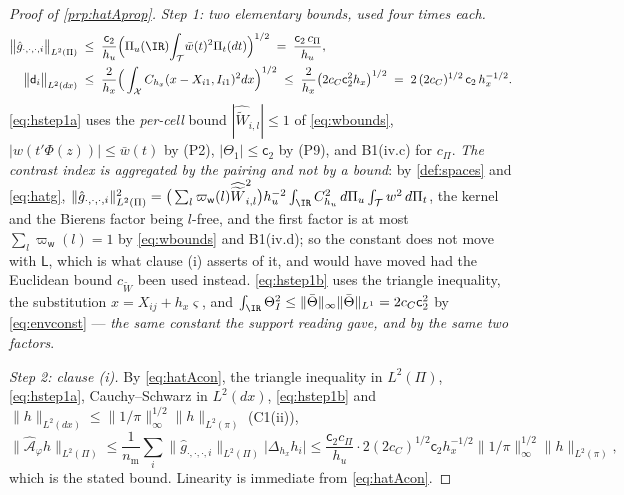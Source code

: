 \begin{proof}[Proof of \cref{prp:hatAprop}]
\emph{Step 1: two elementary bounds, used four times each.}
\begin{align}
\big\|\hat g_{\cdot,\cdot,\cdot,i}\big\|_{L^{2}(\Pi)}
&\;\le\;\frac{\mathsf c_2}{h_u}\Big(\Pi_u(\IR)\!\int_{\mathcal T}\!\bar w(t)^{2}\Pi_t(dt)\Big)^{1/2}
\;=\;\frac{\mathsf c_2\,c_\Pi}{h_u},
\label{eq:hstep1a}\\
\big\|\mathsf d_i\big\|_{L^{2}(dx)}
&\;\le\;\frac{2}{h_x}\Big(\int_{\mathcal X}C_{h_x}(x-X_{i1},I_{i1})^{2}dx\Big)^{1/2}
\;\le\;\frac{2}{h_x}\big(2c_C\mathsf c_2^{2}h_x\big)^{1/2}
\;=\;2\,(2c_C)^{1/2}\,\mathsf c_2\,h_x^{-1/2}.
\label{eq:hstep1b}
\end{align}
\eqref{eq:hstep1a} uses the \emph{per-cell} bound $|\widehat{\widetilde W}_{i,l}|\le1$ of
\eqref{eq:wbounds}, $|w(t'\Phi(z))|\le\bar w(t)$ by (P2), $|\Theta_1|\le\mathsf c_2$ by (P9),
and B1(iv.c) for $c_\Pi$. \emph{The contrast index is aggregated by the pairing and not by a bound}:
by \cref{def:spaces} and \eqref{eq:hatg},
$\|\hat g_{\cdot,\cdot,\cdot,i}\|^{2}_{L^{2}(\Pi)}
=\big(\sum_l\varpi_{\mathsf w}(l)\widehat{\widetilde W}_{i,l}^{2}\big)h_u^{-2}
\int_\IR C_{h_u}^{2}\,d\Pi_u\int_{\mathcal T}w^{2}\,d\Pi_t$, the kernel and the Bierens factor being
$l$-free, and the first factor is at most $\sum_l\varpi_{\mathsf w}(l)=1$ by \eqref{eq:wbounds} and
B1(iv.d); so the constant does not move with $\mathsf L$, which is what clause \textup{(i)}
asserts of it, and would have moved had the Euclidean bound $c_{\widetilde W}$ been used instead.
\eqref{eq:hstep1b} uses the triangle inequality, the substitution
$x=X_{ij}+h_x\varsigma$, and $\int_\IR\Theta_{I}^{2}\le\|\bar\Theta\|_\infty\|\bar\Theta\|_{L^{1}}=2c_C\mathsf c_2^{2}$
by \eqref{eq:envconst} --- \emph{the same constant the support reading gave, and by the same two
factors}.

\emph{Step 2: clause (i).} By \eqref{eq:hatAcon}, the triangle inequality in $L^{2}(\Pi)$,
\eqref{eq:hstep1a}, Cauchy--Schwarz in $L^{2}(dx)$, \eqref{eq:hstep1b} and
$\|h\|_{L^{2}(dx)}\le\|1/\pi\|_\infty^{1/2}\|h\|_{L^{2}(\pi)}$ (C1(ii)),
\[
\big\|\hat{\mathcal A}_\varphi h\big\|_{L^{2}(\Pi)}
\le\frac1{n_{\mathrm m}}\sum_{i}\big\|\hat g_{\cdot,\cdot,\cdot,i}\big\|_{L^{2}(\Pi)}\big|\Delta_{h_x}h_i\big|
\le\frac{\mathsf c_2c_\Pi}{h_u}\cdot 2(2c_C)^{1/2}\mathsf c_2h_x^{-1/2}\|1/\pi\|_\infty^{1/2}\|h\|_{L^{2}(\pi)},
\]
which is the stated bound. Linearity is immediate from \eqref{eq:hatAcon}.


\end{proof}
